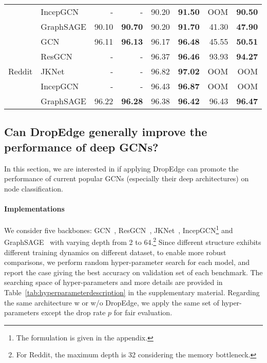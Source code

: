 \documentclass{article}
\begin{document}
\begin{table}[htbp]
\begin{tabular}{rl|rr|rr|rr}
          & IncepGCN & -     & -     & 90.20 & \textbf{91.50} & OOM   & \textbf{90.50} \\
          & GraphSAGE & 90.10 & \textbf{90.70} & 90.20 & \textbf{91.70} & 41.30 & \textbf{47.90} \\
    \hline
    \multicolumn{1}{c}{\multirow{5}[2]{*}{Reddit}} & GCN   & 96.11 & \textbf{96.13} & 96.17 & \textbf{96.48} & 45.55 & \textbf{50.51} \\
          & ResGCN & -     & -     & 96.37 & \textbf{96.46} & 93.93 & \textbf{94.27} \\
          & JKNet & -     & -     & 96.82 & \textbf{97.02} & OOM   & OOM \\
          & IncepGCN & -     & -     & 96.43 & \textbf{96.87} & OOM   & OOM \\
          & GraphSAGE & 96.22 & \textbf{96.28} & 96.38 & \textbf{96.42} & 96.43 & \textbf{96.47} \\
    \hline
    \end{tabular}\label{tab:dropvsnodrop_small}\end{table}


\subsection{Can DropEdge generally improve the performance of deep GCNs?}\label{sec.cmpdropedge}

In this section, we are interested in if applying DropEdge can promote the performance of current popular GCNs (especially their deep architectures) on node classification.




\paragraph{Implementations}
We consider five backbones: GCN~\citep{Kipf2017}, ResGCN~\citep{he2016deep,li2019can}, JKNet~\citep{Xu2018}, IncepGCN\footnote{The formulation is given in the appendix.} and GraphSAGE~\citep{hamilton2017inductive} with varying depth from 2 to 64.\footnote{For Reddit, the maximum depth is 32 considering the memory bottleneck.} Since different structure exhibits different training dynamics on different dataset, to enable more robust comparisons, we perform random  hyper-parameter search for each model, and report the case giving the best accuracy on validation set of each benchmark. The searching space of hyper-parameters and more details are provided in Table~\ref{tab:hyperparameterdescription} in the supplementary material. Regarding the same architecture w or w/o DropEdge, we apply the same set of hyper-parameters except the drop rate $p$ for fair evaluation.
\end{document}
